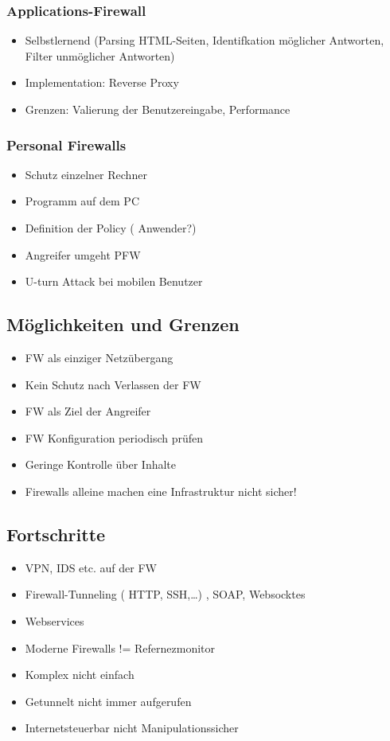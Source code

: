 {\subsubsection*{ Applications-Firewall }
\begin{itemize}
	\item Selbstlernend (Parsing HTML-Seiten, Identifkation möglicher Antworten, Filter unmöglicher Antworten)
	\item Implementation: Reverse Proxy 
	\item Grenzen: Valierung der Benutzereingabe, Performance
\end{itemize}

\subsubsection*{ Personal Firewalls }
\begin{itemize}
	\item Schutz einzelner Rechner
	\item Programm auf dem PC
	\item Definition der Policy ( Anwender?)
	\item Angreifer umgeht PFW
	\item U-turn Attack bei mobilen Benutzer
\end{itemize}

\subsection*{ Möglichkeiten und Grenzen }
\begin{itemize}
	\item FW als einziger Netzübergang 
	\item Kein Schutz nach Verlassen der FW
	\item FW als Ziel der Angreifer
	\item FW Konfiguration periodisch prüfen
	\item Geringe Kontrolle über Inhalte
	\item Firewalls alleine machen eine Infrastruktur nicht sicher!
\end{itemize}


\subsection*{  Fortschritte }
\begin{itemize}
	\item VPN, IDS etc. auf der FW
	\item Firewall-Tunneling ( HTTP, SSH,…) , SOAP, Websocktes
	\item Webservices
	\item Moderne Firewalls != Refernezmonitor
	\item Komplex nicht einfach
	\item Getunnelt nicht immer aufgerufen
	\item Internetsteuerbar nicht Manipulationssicher
\end{itemize}



}
